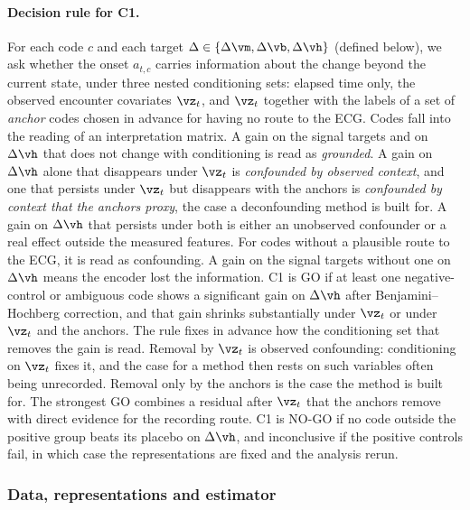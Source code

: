 \paragraph{Decision rule for C1.} For each code $c$ and each target $\Delta\in\{\Delta\vm,\Delta\vb,\Delta\vh\}$ (defined below), we ask whether the onset $a_{t,c}$ carries information about the change beyond the current state, under three nested conditioning sets: elapsed time only, the observed encounter covariates $\vz_t$, and $\vz_t$ together with the labels of a set of \emph{anchor} codes chosen in advance for having no route to the ECG. Codes fall into the reading of an interpretation matrix. A gain on the signal targets and on $\Delta\vh$ that does not change with conditioning is read as \emph{grounded}. A gain on $\Delta\vh$ alone that disappears under $\vz_t$ is \emph{confounded by observed context}, and one that persists under $\vz_t$ but disappears with the anchors is \emph{confounded by context that the anchors proxy}, the case a deconfounding method is built for. A gain on $\Delta\vh$ that persists under both is either an unobserved confounder or a real effect outside the measured features. For codes without a plausible route to the ECG, it is read as confounding. A gain on the signal targets without one on $\Delta\vh$ means the encoder lost the information. C1 is GO if at least one negative-control or ambiguous code shows a significant gain on $\Delta\vh$ after Benjamini--Hochberg correction, and that gain shrinks substantially under $\vz_t$ or under $\vz_t$ and the anchors. The rule fixes in advance how the conditioning set that removes the gain is read. Removal by $\vz_t$ is observed confounding: conditioning on $\vz_t$ fixes it, and the case for a method then rests on such variables often being unrecorded. Removal only by the anchors is the case the method is built for. The strongest GO combines a residual after $\vz_t$ that the anchors remove with direct evidence for the recording route. C1 is NO-GO if no code outside the positive group beats its placebo on $\Delta\vh$, and inconclusive if the positive controls fail, in which case the representations are fixed and the analysis rerun.

\subsubsection{Data, representations and estimator}
\label{sec:gonogo-data}

